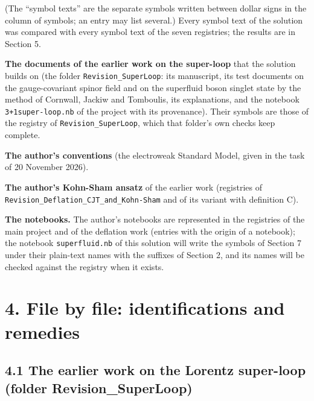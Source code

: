 \documentclass[
  10pt,
]{article}
\begin{document}
(The ``symbol texts'' are the separate symbols written between dollar
signs in the column of symbols; an entry may list several.) Every symbol
text of the solution was compared with every symbol text of the seven
registries; the results are in Section 5.

\textbf{The documents of the earlier work on the super-loop} that the
solution builds on (the folder \texttt{Revision\_SuperLoop}: its
manuscript, its test documents on the gauge-covariant spinor field and
on the superfluid boson singlet state by the method of Cornwall, Jackiw
and Tomboulis, its explanations, and the notebook
\texttt{3+1super-loop.nb} of the project with its provenance). Their
symbols are those of the registry of \texttt{Revision\_SuperLoop}, which
that folder's own checks keep complete.

\textbf{The author's conventions} (the electroweak Standard Model, given
in the task of 20 November 2026).

\textbf{The author's Kohn-Sham ansatz} of the earlier work (registries
of \texttt{Revision\_Deflation\_CJT\_and\_Kohn-Sham} and of its variant
with definition C).

\textbf{The notebooks.} The author's notebooks are represented in the
registries of the main project and of the deflation work (entries with
the origin of a notebook); the notebook \texttt{superfluid.nb} of this
solution will write the symbols of Section 7 under their plain-text
names with the suffixes of Section 2, and its names will be checked
against the registry when it exists.

\hypertarget{file-by-file-identifications-and-remedies}{%
\section{4. File by file: identifications and
remedies}\label{file-by-file-identifications-and-remedies}}

\hypertarget{the-earlier-work-on-the-lorentz-super-loop-folder-revision_superloop}{%
\subsection{4.1 The earlier work on the Lorentz super-loop (folder
Revision\_SuperLoop)}\label{the-earlier-work-on-the-lorentz-super-loop-folder-revision_superloop}}
\end{document}
